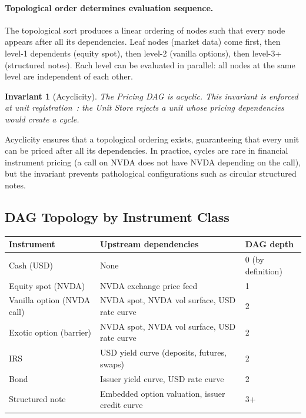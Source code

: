 \documentclass[11pt,a4paper]{article}
\newtheorem{invariant}[definition]{Invariant}
\begin{document}
\paragraph{Topological order determines evaluation sequence.}  The topological sort produces a linear ordering of nodes such that every node appears after all its dependencies.  Leaf nodes (market data) come first, then level-1 dependents (equity spot), then level-2 (vanilla options), then level-3+ (structured notes).  Each level can be evaluated in parallel: all nodes at the same level are independent of each other.

\begin{invariant}[Acyclicity]
\label{inv:acyclicity}
The Pricing DAG is acyclic.  This invariant is enforced at unit registration~\cite[\S3.4]{ledger}: the Unit Store rejects a unit whose pricing dependencies would create a cycle.
\end{invariant}

\noindent Acyclicity ensures that a topological ordering exists, guaranteeing that every unit can be priced after all its dependencies.  In practice, cycles are rare in financial instrument pricing (a call on NVDA does not have NVDA depending on the call), but the invariant prevents pathological configurations such as circular structured notes.

\subsection{DAG Topology by Instrument Class}

\begin{center}
\small
\begin{tabular}{l l l}
\toprule
\textbf{Instrument} & \textbf{Upstream dependencies} & \textbf{DAG depth} \\
\midrule
Cash (USD) & None & 0 (by definition) \\
Equity spot (NVDA) & NVDA exchange price feed & 1 \\
Vanilla option (NVDA call) & NVDA spot, NVDA vol surface, USD rate curve & 2 \\
Exotic option (barrier) & NVDA spot, NVDA vol surface, USD rate curve & 2 \\
IRS & USD yield curve (deposits, futures, swaps) & 2 \\
Bond & Issuer yield curve, USD rate curve & 2 \\
Structured note & Embedded option valuation, issuer credit curve & 3+ \\
\bottomrule
\end{tabular}
\end{center}
\end{document}
